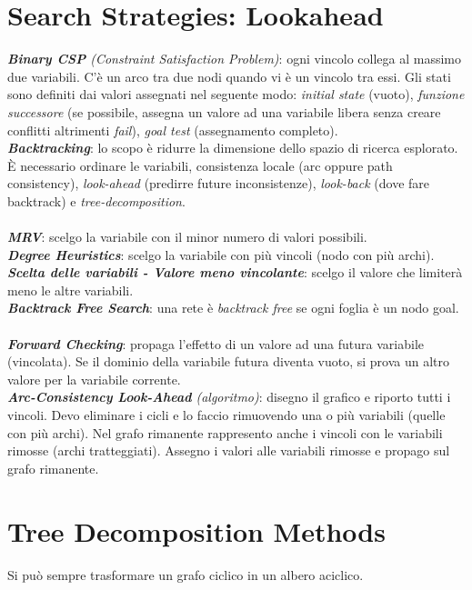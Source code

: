 \documentclass[a4paper, notitlepage, 9pt]{extreport}
\begin{document}
\chapter*{Search Strategies: Lookahead}
\textit{\textbf{Binary CSP} (Constraint Satisfaction Problem)}: ogni vincolo collega al massimo due variabili. C'è un arco tra due nodi quando vi è un vincolo tra essi.
Gli stati sono definiti dai valori assegnati nel seguente modo: \textit{initial state} (vuoto), \textit{funzione successore} (se possibile, assegna un valore ad una variabile libera senza creare conflitti altrimenti \textit{fail}), \textit{goal test} (assegnamento completo).\\
\textit{\textbf{Backtracking}}: lo scopo è ridurre la dimensione dello spazio di ricerca esplorato. È necessario ordinare le variabili, consistenza locale (arc oppure path consistency), \textit{look-ahead} (predirre future inconsistenze), \textit{look-back} (dove fare backtrack) e \textit{tree-decomposition}.\\\\
\textit{\textbf{MRV}}: scelgo la variabile con il minor numero di valori possibili.\\
\textit{\textbf{Degree Heuristics}}: scelgo la variabile con più vincoli (nodo con più archi).\\
\textit{\textbf{Scelta delle variabili - Valore meno vincolante}}: scelgo il valore che limiterà meno le altre variabili.\\
\textit{\textbf{Backtrack Free Search}}: una rete è \textit{backtrack free} se ogni foglia è un nodo goal.\\\\
\textit{\textbf{Forward Checking}}: propaga l'effetto di un valore ad una futura variabile (vincolata). Se il dominio della variabile futura diventa vuoto, si prova un altro valore per la variabile corrente.\\
\textit{\textbf{Arc-Consistency Look-Ahead} (algoritmo)}: disegno il grafico e riporto tutti i vincoli. Devo eliminare i cicli e lo faccio rimuovendo una o più variabili (quelle con più archi). Nel grafo rimanente rappresento anche i vincoli con le variabili rimosse (archi tratteggiati). Assegno i valori alle variabili rimosse e propago sul grafo rimanente.



\chapter*{Tree Decomposition Methods}
Si può sempre trasformare un grafo ciclico in un albero aciclico.
\end{document}
